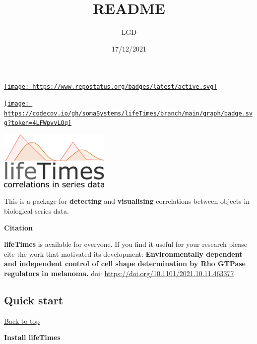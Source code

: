 \documentclass[
]{article}
\title{README}
\author{LGD}
\date{17/12/2021}
\begin{document}
\maketitle

{
\setcounter{tocdepth}{3}
\tableofcontents
}
\href{https://www.repostatus.org/\#active}{\texttt{[image: https://www.repostatus.org/badges/latest/active.svg]}}

\href{https://codecov.io/gh/somaSystems/lifeTimes}{\texttt{[image: https://codecov.io/gh/somaSystems/lifeTimes/branch/main/graph/badge.svg?token=4LFWpvvLOq]}}

\includegraphics[width=0.4\textwidth,height=\textheight]{man/figures/lifeTimesLogo.png}

This is a package for \textbf{detecting} and \textbf{visualising}
correlations between objects in biological series data.

\textbf{Citation}

\textbf{lifeTimes} is available for everyone. If you find it useful for
your research please cite the work that motivated its development:
\textbf{Environmentally dependent and independent control of cell shape
determination by Rho GTPase regulators in melanoma.} doi:
\url{https://doi.org/10.1101/2021.10.11.463377}

\hypertarget{quick-start}{%
\subsection{\texorpdfstring{\textbf{Quick
start}}{Quick start}}\label{quick-start}}

\protect\hyperlink{}{Back to top}

\textbf{Install lifeTimes}
\end{document}
